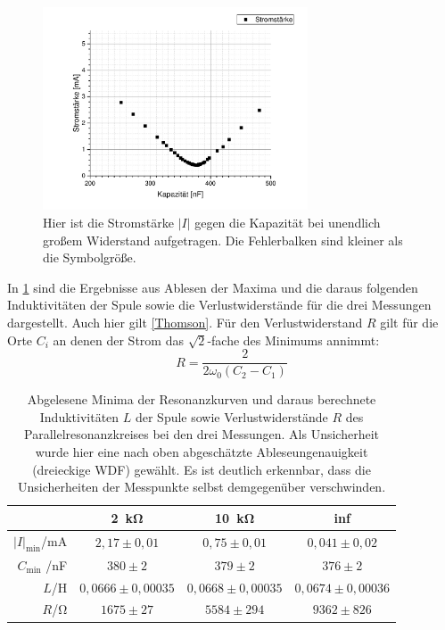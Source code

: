 \documentclass[
	a4paper,
	12pt,
	pagesize,
	ngerman
]{scrartcl}
\begin{document}
	\begin{figure}[H]
		\includegraphics[width=0.7\textwidth]{Parallelstromkreis_inf}
		\centering
		\caption{Hier ist die Stromstärke $ \left| I \right| $ gegen die Kapazität bei unendlich großem Widerstand aufgetragen. Die Fehlerbalken sind kleiner als die Symbolgröße.}
		\label{Para_inf}
		\centering
	\end{figure}
	
	In \cref{Para_Erg} sind die Ergebnisse aus Ablesen der Maxima und die daraus folgenden Induktivitäten der Spule sowie die Verlustwiderstände für die drei Messungen dargestellt.
	Auch hier gilt \cref{Thomson}.
	Für den Verlustwiderstand $R$ gilt für die Orte $C_i$ an denen der Strom das $ \sqrt{2} $-fache des Minimums annimmt:
	\begin{equation}
	R= \frac{2}{2\omega_0 \left( C_2 - C_1 \right)}
	\end{equation}
	
	\begin{table}[H]
		\centering
		\begin{tabular}{ r | c | c | c }
			&\SI{2}{\kilo \ohm} & \SI{10}{\kilo \ohm} & inf  \\ \hline
			$  \left| I \right|_\text{min}$/\si{mA} & $2,17\pm 0,01$ &$0,75\pm 0,01$ & $0,041\pm 0,02$\\ 
			$C_\text{min}$ /\si{nF} &$380\pm2$&$379\pm2$&$376\pm2$\\
			$L$/\si{\henry} & $0,0666\pm 0,00035$ & $0,0668 \pm 0,00035$ & $0,0674\pm 0,00036$\\
			$R$/\si{\ohm} & $1675\pm 27$&$5584\pm 294$ & $9362\pm 826$\\
		\end{tabular}
		\caption{Abgelesene Minima der Resonanzkurven und daraus berechnete Induktivitäten $L$ der Spule sowie Verlustwiderstände $R$ des Parallelresonanzkreises bei den drei Messungen. Als Unsicherheit wurde hier eine nach oben abgeschätzte Ableseungenauigkeit (dreieckige WDF) gewählt. Es ist deutlich erkennbar, dass die Unsicherheiten der Messpunkte selbst demgegenüber verschwinden.}
		\label{Para_Erg} 
	\end{table}
\end{document}
